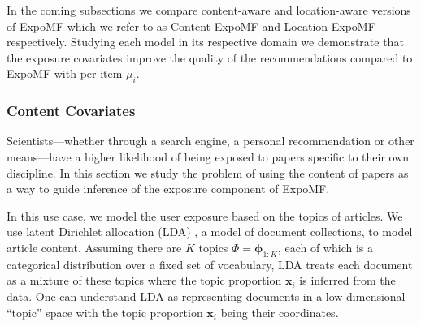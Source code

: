 In the coming subsections we compare content-aware and location-aware
versions of ExpoMF which we refer to as Content ExpoMF and Location ExpoMF
respectively. Studying each model in its respective domain we demonstrate
that the exposure covariates improve the quality of the recommendations
compared to ExpoMF with per-item $\mu_i$.




\subsubsection*{Content Covariates}\label{sec:si_doc}

Scientists---whether through a search engine, a personal recommendation
or other means---have a higher likelihood of being exposed to papers
specific to their own discipline. In this section we study the problem of
using the content of papers as a way to guide inference of the exposure
component of ExpoMF.


In this use case, we model the user exposure based on the topics of
articles. We use latent Dirichlet allocation (LDA) \cite{blei2003latent},
a model of document collections, to model article content. 
Assuming there are $K$ topics $\Phi = \boldsymbol\phi_{1:K}$, each of which is a categorical distribution over a fixed set of vocabulary, LDA treats each document as a mixture of these topics where the topic proportion $\mathbf{x}_i$ is inferred from the data. One can understand LDA as representing documents in a low-dimensional ``topic'' space with the topic proportion $\mathbf{x}_i$ being their coordinates.  

